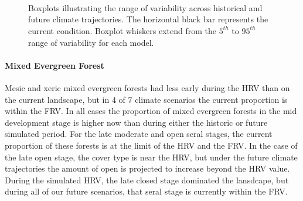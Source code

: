 \begin{figure}[htbp]
  \centering
  \qquad
   \\
  \qquad
   \\
    \\
  \qquad
    \qquad
    \caption{Boxplots illustrating the range of variability across historical and future climate trajectories. The horizontal black bar represents the current condition. Boxplot whiskers extend from the $5^{th}$ to $95^{th}$ range of variability for each model. }
  \label{fig:covcond_rfrx}
\end{figure} %

\paragraph{Mixed Evergreen Forest} Mesic and xeric mixed evergreen forests had less early during the HRV than on the current landscape, but in 4 of 7 climate scenarios the current proportion is within the FRV. In all cases the proportion of mixed evergreen forests in the mid development stage is higher now than during either the historic or future simulated period. For the late moderate and open seral stages, the current proportion of these forests is at the limit of the HRV and the FRV. In the case of the late open stage, the cover type is near the HRV, but under the future climate trajectories the amount of open is projected to increase beyond the HRV value. During the simulated HRV, the late closed stage dominated the lansdcape, but during all of our future scenarios, that seral stage is currently within the FRV. 

